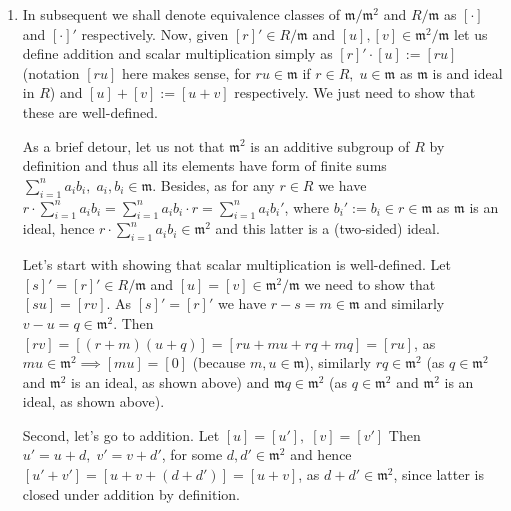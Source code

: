 \documentclass[8pt]{article} %
\begin{document}
\begin{enumerate}[label=\bfseries Problem \arabic*.]
{\begin{enumerate}[label=(\arabic*).]
{				The mapping mentioned above is clearly onto, as for $p(x)=x^2+px+q$ the matrix
				\[A:=\begin{pmatrix}-p&-q\\1&0\end{pmatrix}\]will clearly have $p_A=p$. Let us proceed to show
				it is injective. Suppose for some $A,\;B\in M_2(F)$, $p_A=p_B\in F[x]$
				is monic irreducible and let us show that $[A]=[B]$. 

				\begin{lemma}\end{lemma}
				\begin{proof}Let me apologize to begin with\qed\end{proof}
				}
		\end{enumerate}
		}
	\item{
		\newcommand{\m}{\mathfrak{m}}
		In subsequent we shall denote equivalence classes of $\mathfrak{m}/\mathfrak{m}^2$ and $R/\mathfrak{m}$ as $[\cdot]$ and
		$[\cdot]'$ respectively. Now, given $[r]'\in R/\m$ and $[u],[v]\in \m^2/\m$ let us define addition and scalar multiplication
		simply as $[r]'\cdot[u]:=[ru]$ (notation $[ru]$ here makes sense, for $ru\in\m$ if $r\in R,\;u\in\m$ as $\m$ is and 
		ideal in $R$)
		and $[u]+[v]:=[u+v]$ respectively. We just need to show that these are well-defined.

		As a brief detour, let us not that $\m^2$ is an additive subgroup of $R$ by definition and thus all its elements
		have form of finite sums $\sum_{i=1}^n a_ib_i,\;a_i,b_i\in\m$. Besides, as for any $r\in R$ we have $r\cdot
		\sum_{i=1}^n a_ib_i=\sum_{i=1}^n a_ib_i\cdot r=\sum_{i=1}^n a_ib_i'$, where $b_i':=b_i\in r\in\m$ as $\m$ is
		an ideal, hence $r\cdot\sum_{i=1}^n a_ib_i\in\m^2$ and this latter is a (two-sided) ideal.

		Let's start with showing that scalar multiplication is well-defined.
		Let $[s]'=[r]'\in R/\m$ and $[u]=[v]\in \m^2/\m$ we need to show that
		$[su]=[rv]$. As $[s]'=[r]'$ we have $r-s=m\in\m$ and similarly $v-u=q\in\m^2$. Then $[rv]=[(r+m)(u+q)]=
		[ru+mu+rq+mq]=[ru]$, as $mu\in\m^2\implies[mu]=[0]$ (because $m,u\in\m$), similarly $rq\in\m^2$ (as $q\in \m^2$ and
		$\m^2$ is an ideal, as shown above) and $\m q\in\m^2$ (as $q\in \m^2$ and $\m^2$ is an ideal, as shown above).

		Second, let's go to addition. Let $[u]=[u'],\;[v]=[v']$ Then $u'=u+d,\;v'=v+d'$, for some $d,d'\in\m^2$ and hence
		$[u'+v']=[u+v+(d+d')]=[u+v]$, as $d+d'\in\m^2$, since latter is closed under addition by definition.

}
\end{enumerate}
\end{document}
